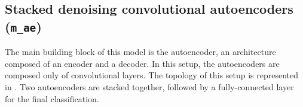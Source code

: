 \begin{table*}[]
\captionsetup{font=scriptsize, justification=centering}
\centering
{}
\caption{\texttt{m_resnet} model representation. \texttt{BN} stands for batch normalization, \texttt{MP} for max pooling, \texttt{S1-S4} represent the 4 stages of the identity-convolutional blocks. \texttt{AP} stands for average pooling, pooling is done only along the temporal dimension.}
\label{m_resnet_table}
\end{table*}

\subsection{Stacked denoising convolutional autoencoders (\texttt{m_ae})}
\label{sec:m_ae}
The main building block of this model is the autoencoder, an architecture composed of an encoder and a decoder. In this setup, the autoencoders are composed only of convolutional layers. The topology of this setup is represented in . Two autoencoders are stacked together, followed by a \mbox{fully-connected} layer for the final classification.\\

